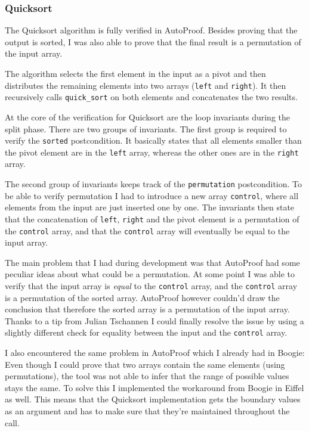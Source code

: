 \documentclass[a4paper,10pt]{article}
\begin{document}
\subsubsection{Quicksort}

The Quicksort algorithm is fully verified in AutoProof.
Besides proving that the output is sorted, I was also able to prove that the final result is a permutation of the input array.

The algorithm selects the first element in the input as a pivot and then distributes the remaining elements into two arrays (\lstinline!left! and \lstinline!right!).
It then recursively calls \lstinline!quick_sort! on both elements and concatenates the two results.

At the core of the verification for Quicksort are the loop invariants during the split phase.
There are two groups of invariants.
The first group is required to verify the \lstinline!sorted! postcondition.
It basically states that all elements smaller than the pivot element are in the \lstinline!left! array, whereas the other ones are in the \lstinline!right! array.

The second group of invariants keeps track of the \lstinline!permutation! postcondition.
To be able to verify permutation I had to introduce a new array \lstinline!control!, where all elements from the input are just inserted one by one.
The invariants then state that the concatenation of \lstinline!left!, \lstinline!right! and the pivot element is a permutation of the \lstinline!control! array,
and that the \lstinline!control! array will eventually be equal to the input array.

The main problem that I had during development was that AutoProof had some peculiar ideas about what could be a permutation.
At some point I was able to verify that the input array is \emph{equal} to the \lstinline!control! array, and the \lstinline!control! array is a permutation of the sorted array.
AutoProof however couldn'd draw the conclusion that therefore the sorted array is a permutation of the input array.
Thanks to a tip from Julian Tschannen I could finally resolve the issue by using a slightly different check for equality between the input and the \lstinline!control! array.

I also encountered the same problem in AutoProof which I already had in Boogie:
Even though I could prove that two arrays contain the same elements (using permutations), the tool was not able to infer that the range of possible values stays the same.
To solve this I implemented the workaround from Boogie in Eiffel as well.
This means that the Quicksort implementation gets the boundary values as an argument and has to make sure that they're maintained throughout the call.
\end{document}
